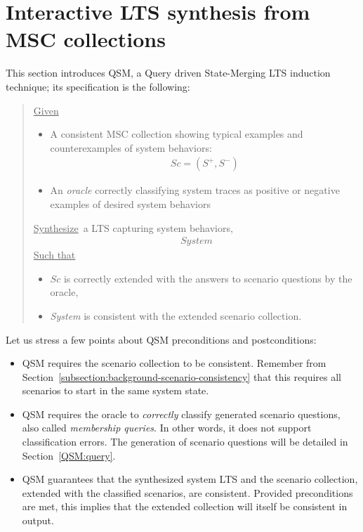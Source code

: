 \section{Interactive LTS synthesis from MSC collections\label{section:lts-induction-from-mscs}}

This section introduces QSM, a Query driven State-Merging LTS induction technique; its specification is the following:

\begin{quote}
\underline{Given}
\begin{itemize}
\item A consistent MSC collection showing typical examples and counterexamples of system behaviors:
\begin{align*}Sc = (S^+,S^-)\end{align*}
\item An \emph{oracle} correctly classifying system traces as positive or negative examples of desired system behaviors
\end{itemize}
\underline{Synthesize}~a LTS capturing system behaviors,
\begin{align*}System\end{align*}
\underline{Such that}
\begin{itemize}
\item $Sc$ is correctly extended with the answers to scenario questions by the oracle,
\item \emph{System} is consistent with the extended scenario collection.
\end{itemize}
\end{quote}

Let us stress a few points about QSM preconditions and postconditions:
\begin{itemize}
\item QSM requires the scenario collection to be consistent. Remember from Section~\ref{subsection:background-scenario-consistency} that this requires all scenarios to start in the same system state.
\item QSM requires the oracle to \emph{correctly} classify generated scenario questions, also called \emph{membership queries}. In other words, it does not support classification errors. The generation of scenario questions will be detailed in Section~\ref{QSM:query}.
\item QSM guarantees that the synthesized system LTS and the scenario collection, extended with the classified scenarios, are consistent. Provided preconditions are met, this implies that the extended collection will itself be consistent in output.
\end{itemize}

